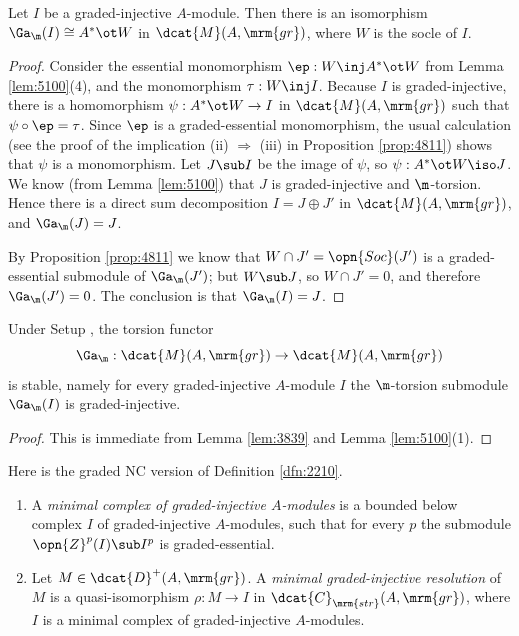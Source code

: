 \begin{lem} \label{lem:3839}
Let $I$ be a graded-injective $A$-module. Then there is an isomorphism
$\Ga_{\m}(I) \cong A^* \ot W$ in $\dcat{M}(A, \mrm{gr})$,
where $W$ is the socle of $I$. 
\end{lem}

\begin{proof}
Consider the essential monomorphism $\ep : W \inj A^* \ot W$ 
from Lemma \ref{lem:5100}(4), and 
the monomorphism $\tau : W \inj I$.
Because $I$ is graded-injective, there is a homomorphism 
$\psi : A^* \ot W \to I$ in $\dcat{M}(A, \mrm{gr})$
such that $\psi \circ \ep = \tau$. Since $\ep$ is a graded-essential 
monomorphism, the usual calculation (see the proof of the implication 
(ii) $\Rightarrow$ (iii) in Proposition \ref{prop:4811}) shows that 
$\psi$ is a monomorphism. Let $J \sub I$ be the image of $\psi$,
so $\psi : A^* \ot W \iso J$. We know (from Lemma \ref{lem:5100}) 
that $J$ is graded-injective and $\m$-torsion. Hence there is a direct sum 
decomposition $I = J \oplus J'$
in $\dcat{M}(A, \mrm{gr})$, and $\Ga_{\m}(J) = J$.

By Proposition \ref{prop:4811} we know that 
$W \cap J' = \opn{Soc}(J')$ is a graded-essential submodule of $\Ga_{\m}(J')$; 
but $W \sub J$, so $W \cap J' = 0$, and therefore $\Ga_{\m}(J') = 0$.
The conclusion is that $\Ga_{\m}(I) = J$. 
\end{proof}

\begin{thm} \label{thm:3990}   
Under Setup \tup{\ref{setup:3755}}, the torsion functor
\[ \Ga_{\m} : \dcat{M}(A, \mrm{gr}) \to \dcat{M}(A, \mrm{gr}) \]
is stable, namely for every graded-injective $A$-module $I$
the $\m$-torsion submodule $\Ga_{\m}(I)$ is graded-injective. 
\end{thm}

\begin{proof}
This is immediate from Lemma \ref{lem:3839} and
Lemma \ref{lem:5100}(1). 
\end{proof}

Here is the graded NC version of Definition \ref{dfn:2210}.

\begin{dfn} \label{dfn:3837} \mbox{}
\begin{enumerate}
\item A {\em minimal complex of graded-injective $A$-modules}%
is a bounded below complex $I$ of graded-injective $A$-modules, such 
that for every $p$ the submodule $\opn{Z}^p(I) \sub I^p$ is graded-essential.

\item Let $M \in \dcat{D}^+(A, \mrm{gr})$. A 
{\em minimal graded-injective resolution}%
of $M$ is a  quasi-isomorphism $\rho : M \to I$ 
in $\dcat{C}_{\mrm{str}}(A, \mrm{gr})$, where $I$ is a minimal complex of 
graded-injective $A$-modules.
\end{enumerate}
\end{dfn}

